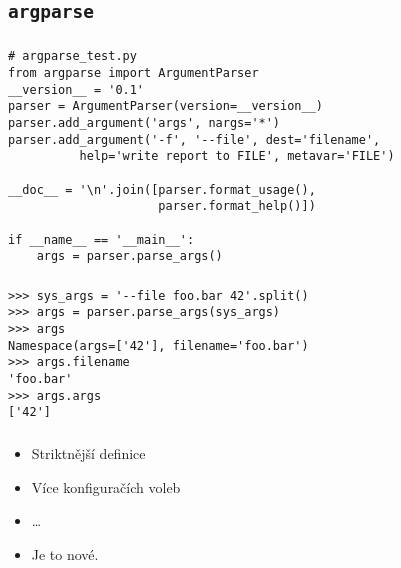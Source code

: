 \subsection{\texttt{argparse}}
\begin{frame}[fragile]
\frametitle{\insertsection}
\framesubtitle{\insertsubsection}

\begin{verbatim}
# argparse_test.py
from argparse import ArgumentParser
__version__ = '0.1'
parser = ArgumentParser(version=__version__)
parser.add_argument('args', nargs='*')
parser.add_argument('-f', '--file', dest='filename',
          help='write report to FILE', metavar='FILE')

__doc__ = '\n'.join([parser.format_usage(),
                     parser.format_help()])

if __name__ == '__main__':
    args = parser.parse_args()
\end{verbatim}
\end{frame}

\begin{frame}[fragile]
\frametitle{\insertsection}
\framesubtitle{\insertsubsection}

\begin{verbatim}
>>> sys_args = '--file foo.bar 42'.split()
>>> args = parser.parse_args(sys_args)
>>> args
Namespace(args=['42'], filename='foo.bar')
>>> args.filename
'foo.bar'
>>> args.args
['42']
\end{verbatim}
\end{frame}

\begin{frame}
\frametitle{\insertsection}
\framesubtitle{\insertsubsection}
\begin{itemize}[<+->]
\item Striktnější definice
\item Více konfiguračích voleb
\item …
\item Je to nové.
\end{itemize}
\end{frame}
